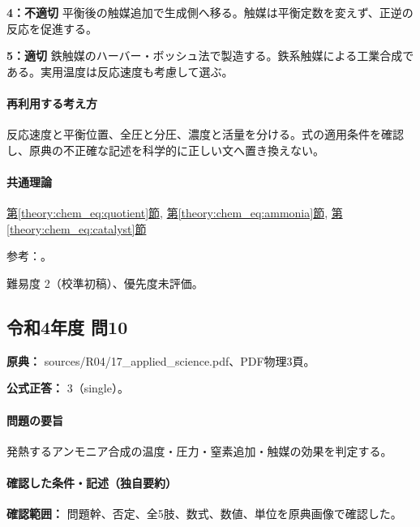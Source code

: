 \noindent\textbf{4：不適切} 平衡後の触媒追加で生成側へ移る。触媒は平衡定数を変えず、正逆の反応を促進する。\par

\noindent\textbf{5：適切} 鉄触媒のハーバー・ボッシュ法で製造する。鉄系触媒による工業合成である。実用温度は反応速度も考慮して選ぶ。\par

\paragraph{再利用する考え方} 反応速度と平衡位置、全圧と分圧、濃度と活量を分ける。式の適用条件を確認し、原典の不正確な記述を科学的に正しい文へ置き換えない。

\paragraph{共通理論} \hyperref[theory:chem_eq:quotient]{第\ref*{theory:chem_eq:quotient}節}, \hyperref[theory:chem_eq:ammonia]{第\ref*{theory:chem_eq:ammonia}節}, \hyperref[theory:chem_eq:catalyst]{第\ref*{theory:chem_eq:catalyst}節}

\par 参考：\cite{iupac_greenbook2012}。

\par 難易度 2（校準初稿）、優先度未評価。

\subsection{令和4年度 問10}
\label{q:r04-reg-applied-10}

\noindent\textbf{原典：} sources/R04/17\_applied\_science.pdf、PDF物理3頁。

\textbf{公式正答：} 3（single）。

\paragraph{問題の要旨} 発熱するアンモニア合成の温度・圧力・窒素追加・触媒の効果を判定する。

\paragraph{確認した条件・記述（独自要約）}\mbox{}\par

\noindent\textbf{確認範囲：} 問題幹、否定、全5肢、数式、数値、単位を原典画像で確認した。\par


